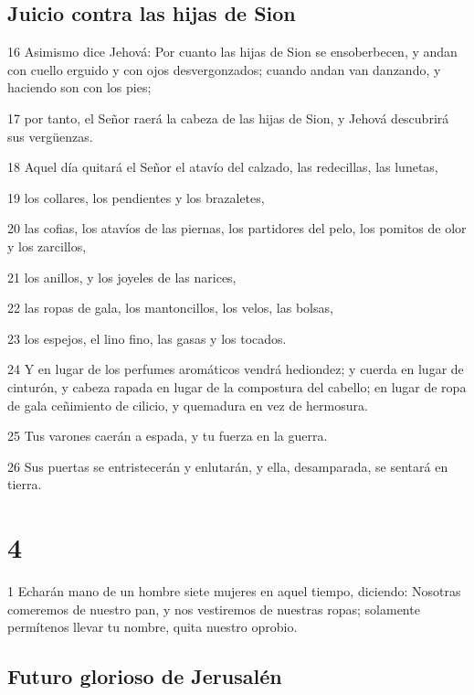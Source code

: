 \section*{Juicio contra las hijas de Sion}

\par 16 Asimismo dice Jehová: Por cuanto las hijas de Sion se ensoberbecen, y andan con cuello erguido y con ojos desvergonzados; cuando andan van danzando, y haciendo son con los pies;
\par 17 por tanto, el Señor raerá la cabeza de las hijas de Sion, y Jehová descubrirá sus vergüenzas.
\par 18 Aquel día quitará el Señor el atavío del calzado, las redecillas, las lunetas,
\par 19 los collares, los pendientes y los brazaletes,
\par 20 las cofias, los atavíos de las piernas, los partidores del pelo, los pomitos de olor y los zarcillos,
\par 21 los anillos, y los joyeles de las narices,
\par 22 las ropas de gala, los mantoncillos, los velos, las bolsas,
\par 23 los espejos, el lino fino, las gasas y los tocados.
\par 24 Y en lugar de los perfumes aromáticos vendrá hediondez; y cuerda en lugar de cinturón, y cabeza rapada en lugar de la compostura del cabello; en lugar de ropa de gala ceñimiento de cilicio, y quemadura en vez de hermosura.
\par 25 Tus varones caerán a espada, y tu fuerza en la guerra.
\par 26 Sus puertas se entristecerán y enlutarán, y ella, desamparada, se sentará en tierra.

\chapter{4}

\par 1 Echarán mano de un hombre siete mujeres en aquel tiempo, diciendo: Nosotras comeremos de nuestro pan, y nos vestiremos de nuestras ropas; solamente permítenos llevar tu nombre, quita nuestro oprobio.

\section*{Futuro glorioso de Jerusalén}

